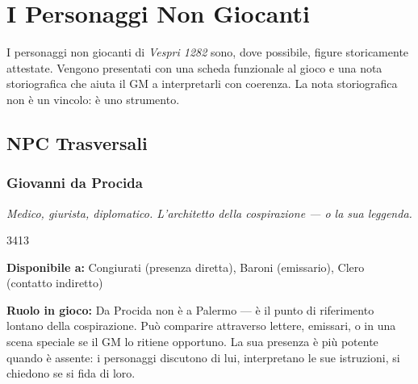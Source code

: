 
\chapter{I Personaggi Non Giocanti}

\lettrine[lines=3]{I}{} personaggi non giocanti di \textit{Vespri 1282}
sono, dove possibile, figure storicamente attestate. Vengono presentati
con una scheda funzionale al gioco e una nota storiografica che aiuta
il GM a interpretarli con coerenza. La nota storiografica non è
un vincolo: è uno strumento.


\secsep

\section{NPC Trasversali}

\subsection{Giovanni da Procida}
\textit{Medico, giurista, diplomatico. L'architetto della cospirazione — o la sua leggenda.}

%
{3}{4}{1}{3}

\textbf{Disponibile a:} Congiurati (presenza diretta), Baroni (emissario),
Clero (contatto indiretto)

\textbf{Ruolo in gioco:} Da Procida non è a Palermo — è il punto di
riferimento lontano della cospirazione. Può comparire attraverso lettere,
emissari, o in una scena speciale se il GM lo ritiene opportuno. La sua
presenza è più potente quando è assente: i personaggi discutono di lui,
interpretano le sue istruzioni, si chiedono se si fida di loro.


